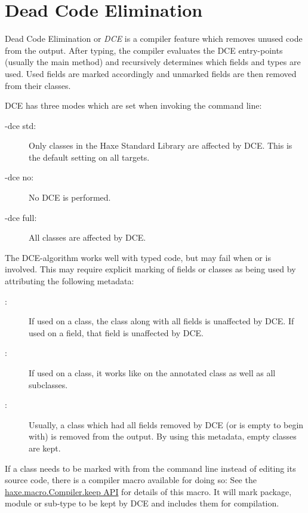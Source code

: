 \section{Dead Code Elimination}
\label{cr-dce}

Dead Code Elimination or \emph{DCE} is a compiler feature which removes unused code from the output. After typing, the compiler evaluates the DCE entry-points (usually the main method) and recursively determines which fields and types are used. Used fields are marked accordingly and unmarked fields are then removed from their classes.

DCE has three modes which are set when invoking the command line:

\begin{description}
    \item[-dce std:] Only classes in the Haxe Standard Library are affected by DCE. This is the default setting on all targets.
    \item[-dce no:] No DCE is performed.
    \item[-dce full:] All classes are affected by DCE.
\end{description}
The DCE-algorithm works well with typed code, but may fail when  or  is involved. This may require explicit marking of fields or classes as being used by attributing the following metadata:

\begin{description}
    \item[:] If used on a class, the class along with all fields is unaffected by DCE. If used on a field, that field is unaffected by DCE.
    \item[:] If used on a class, it works like  on the annotated class as well as all subclasses.
    \item[:] Usually, a class which had all fields removed by DCE (or is empty to begin with) is removed from the output. By using this metadata, empty classes are kept.
\end{description}

If a class needs to be marked with  from the command line instead of editing its source code, there is a compiler macro available for doing so:  See the \href{http://api.haxe.org/haxe/macro/Compiler.html#keep}{haxe.macro.Compiler.keep API} for details of this macro. It will mark package, module or sub-type to be kept by DCE and includes them for compilation.
 
